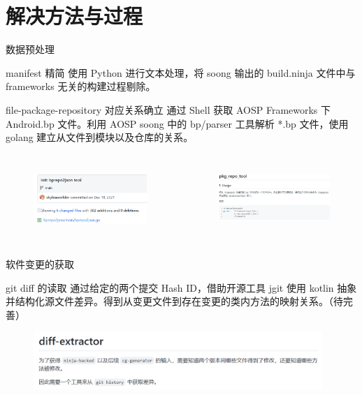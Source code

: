 \section{解决方法与过程}
    \begin{frame}{数据预处理}
        \begin{block}{manifest 精简}
            \small 使用 Python 进行文本处理，将 soong 输出的 build.ninja 文件中与 frameworks 无关的构建过程剔除。\cite{manifest-refinement}
        \end{block}
        \begin{block}{file-package-repository 对应关系确立}
            \small 通过 Shell 获取 AOSP Frameworks 下 Android.bp 文件。\cite{bp-collector}利用 AOSP soong 中的 bp/parser 工具解析 *.bp 文件，使用 golang 建立从文件到模块以及仓库的关系。\cite{pkg-repo-tool}
        \end{block}
        \begin{columns}
            \begin{figure}
                \centering \includegraphics[width=2in]{contents/figure/pkg_repo_tool.png}
                \label{fig:pkg-repo-tool}
            \end{figure}
            \begin{figure}
                \centering \includegraphics[width=2in]{contents/figure/pkg_repo_tool_readme.png}
                \label{fig:pkg-repo-tool-readme}
            \end{figure}
        \end{columns}
    \end{frame}

    \begin{frame}{软件变更的获取}
        \begin{block}{git diff 的读取}
            通过给定的两个提交 Hash ID，借助开源工具 jgit 使用 kotlin 抽象并结构化源文件差异。\cite{diff-extractor}得到从变更文件到存在变更的类内方法的映射关系。（待完善）
        \end{block}
        \begin{figure}
            \centering \includegraphics[width=4.3in]{contents/figure/diff_extractor_readme.png}
            \label{fig:diff-extractor-readme}
        \end{figure}
    \end{frame}

